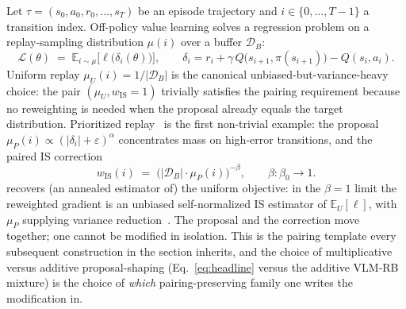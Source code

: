 \documentclass{article}
\begin{document}
Let $\tau=(s_0,a_0,r_0,\dots,s_T)$ be an episode trajectory and
$i\in\{0,\dots,T\!-\!1\}$ a transition index. Off-policy value learning solves a
regression problem on a replay-sampling distribution $\mu(i)$ over a buffer
$\mathcal{D}_B$:
\begin{equation}
  \mathcal{L}(\theta) \;=\; \mathbb{E}_{i\sim\mu}\bigl[\ell\bigl(\delta_i(\theta)\bigr)\bigr],
  \qquad
  \delta_i = r_i + \gamma\,Q\bigl(s_{i+1},\pi(s_{i+1})\bigr) - Q(s_i,a_i).
  \label{eq:loss}
\end{equation}
Uniform replay $\mu_U(i)=1/|\mathcal{D}_B|$ is the canonical
unbiased-but-variance-heavy choice: the pair $(\mu_U,w_{\text{IS}}\!=\!1)$
trivially satisfies the pairing requirement because no reweighting is
needed when the proposal already equals the target distribution.
Prioritized replay~\citep{schaul2016per} is the first non-trivial example:
the proposal $\mu_P(i)\propto(|\delta_i|+\varepsilon)^\alpha$ concentrates
mass on high-error transitions, and the paired IS correction
\begin{equation}
  w_{\text{IS}}(i) \;=\; \bigl(|\mathcal{D}_B|\cdot\mu_P(i)\bigr)^{-\beta},
  \qquad \beta\colon\beta_0 \to 1.
  \label{eq:per-is}
\end{equation}
recovers (an annealed estimator of) the uniform objective: in the
$\beta\!=\!1$ limit the reweighted gradient is an unbiased self-normalized
IS estimator of $\mathbb{E}_U[\ell]$, with $\mu_P$ supplying variance
reduction~\citep[Sec.~3.4]{schaul2016per}. The proposal and the correction
move together; one cannot be modified in isolation. This is the pairing
template every subsequent construction in the section inherits, and the
choice of multiplicative versus additive proposal-shaping
(Eq.~\ref{eq:headline} versus the additive VLM-RB mixture) is the choice
of \emph{which} pairing-preserving family one writes the modification in.
\end{document}
